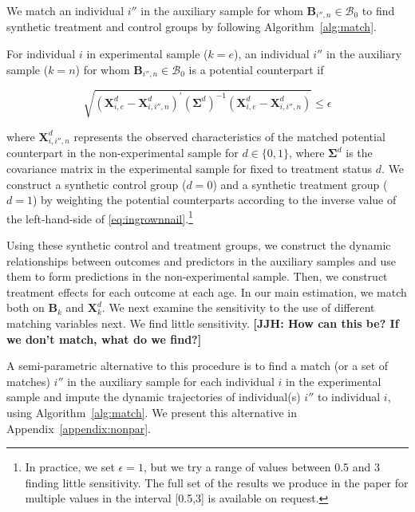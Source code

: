 \noindent We match an individual $i''$ in the auxiliary sample for whom $\bm{B}_{i'',n} \in \mathcal{B}_{0}$ to find synthetic treatment and control groups by following Algorithm~\ref{alg:match}.\\

\onehalfspacing
\begin{algorithm} \label{alg:match}
For individual $i$ in experimental sample ($k=e$), an individual $i''$ in the auxiliary sample ($k=n$) for whom $\bm{B}_{i'',n} \in \mathcal{B}_{0}$ is a potential counterpart if 

\begin{equation}\label{eq:ingrownnail}
\sqrt{(\bm{X}^d_{i,e} - \bm{X}^d_{i,i'',n})^\prime (\bm{\Sigma}^d)^{-1} (\bm{X}^d_{i,e} - \bm{X}^d_{i,i'',n})} \leq \epsilon
\end{equation}

\noindent where $\bm{X}^d_{i,i'',n}$ represents the observed characteristics of the matched potential counterpart in the non-experimental sample for $d \in \{0,1\}$, where $\bm{\Sigma}^d$ is the covariance matrix in the experimental sample for fixed to treatment status $d$. We construct a synthetic control group ($d = 0$) and a synthetic treatment group ($d = 1$) by weighting the potential counterparts according to the inverse value of the left-hand-side of \eqref{eq:ingrownnail}.\footnote{In practice, we set $\epsilon = 1$, but we try a range of values between 0.5 and 3 finding little sensitivity. The full set of the results we produce in the paper for multiple values in the interval [0.5,3] is available on request.}
\end{algorithm}
\doublespacing

\noindent Using these synthetic control and treatment groups, we construct the dynamic relationships between outcomes and predictors in the auxiliary samples and use them to form predictions in the non-experimental sample. Then, we construct treatment effects for each outcome at each age. In our main estimation, we match both on $\bm{B}_k$ and $\bm{X}^d_{k}$. We next examine the sensitivity to the use of different matching variables next. We find little sensitivity. \textbf{[JJH: How can this be? If we don't match, what do we find?]}

\noindent A semi-parametric alternative to this procedure is to find a match (or a set of matches) $i''$ in the auxiliary sample for each individual $i$ in the experimental sample and impute the  dynamic trajectories of individual(s) $i''$ to individual $i$, using Algorithm~\ref{alg:match}. We present this alternative in Appendix~\ref{appendix:nonpar}.\\

